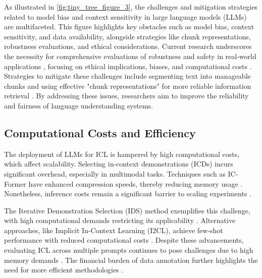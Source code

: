 As illustrated in \autoref{fig:tiny_tree_figure_3}, the challenges and mitigation strategies related to model bias and context sensitivity in large language models (LLMs) are multifaceted. This figure highlights key obstacles such as model bias, context sensitivity, and data availability, alongside strategies like chunk representations, robustness evaluations, and ethical considerations. Current research underscores the necessity for comprehensive evaluations of robustness and safety in real-world applications \cite{qu2024toollearninglargelanguage}, focusing on ethical implications, biases, and computational costs \cite{moradi2024exploringlandscapelargelanguage}. Strategies to mitigate these challenges include segmenting text into manageable chunks and using effective "chunk representations" for more reliable information retrieval \cite{lu2024controlledstudylongcontext,EnhancingI2,nguyen2023incontextexampleselectioninfluences}. By addressing these issues, researchers aim to improve the reliability and fairness of language understanding systems.
\subsection{Computational Costs and Efficiency} \label{subsec:Computational Costs and Efficiency}

The deployment of LLMs for ICL is hampered by high computational costs, which affect scalability. Selecting in-context demonstrations (ICDs) incurs significant overhead, especially in multimodal tasks. Techniques such as IC-Former have enhanced compression speeds, thereby reducing memory usage \cite{wang2024incontextformerlightningfastcompressing}. Nonetheless, inference costs remain a significant barrier to scaling experiments \cite{qin2023context}.

The Iterative Demonstration Selection (IDS) method exemplifies this challenge, with high computational demands restricting its applicability \cite{qin2024incontextlearningiterativedemonstration}. Alternative approaches, like Implicit In-Context Learning (I2CL), achieve few-shot performance with reduced computational costs \cite{li2024implicitincontextlearning}. Despite these advancements, evaluating ICL across multiple prompts continues to pose challenges due to high memory demands \cite{chang2023datacurationstabilizeincontext}. The financial burden of data annotation further highlights the need for more efficient methodologies \cite{rezaei2022superpromptingutilizingmodelindependentcontextual}.


